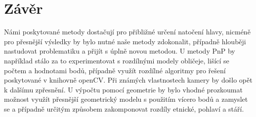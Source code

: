 \documentclass[12pt,a4paper,titlepage,final]{report}
\begin{document}
\section{Závěr}
Námi poskytované metody dostačují pro přibližné určení natočení hlavy, nicméně pro přesnější výsledky by bylo nutné naše metody zdokonalit, případně hlouběji nastudovat problematiku a přijít s úplně novou metodou. U metody PnP by například stálo za to experimentovat s rozdílnými modely obličeje, lišící se počtem a hodnotami bodů, případně využít rozdílné algoritmy pro řešení poskytované v knihovně openCV. Při známých vlastnostech kamery by došlo opět k dalšímu zpřesnění. U výpočtu pomocí geometrie by bylo vhodné prozkoumat možnost využít přesnější geometrický modelu s použitím vícero bodů a zamyslet se a případně určitým způsobem zakomponovat rozdíly etnické, pohlaví a stáří.

\nocite{est_for_mobile}

\begin{flushleft}
  
\end{flushleft}
\end{document}

